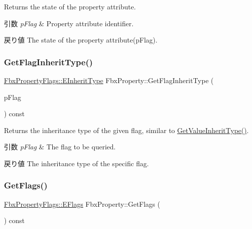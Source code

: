 Returns the state of the property attribute. 
\begin{DoxyParams}{引数}
{\em p\+Flag} & Property attribute identifier. \\
\hline
\end{DoxyParams}
\begin{DoxyReturn}{戻り値}
The state of the property attribute(p\+Flag). 
\end{DoxyReturn}
\mbox{\label{class_fbx_property_ad2c773361ba216ae0fdd3eb8d10cb4e2}} 
\subsubsection{\texorpdfstring{Get\+Flag\+Inherit\+Type()}{GetFlagInheritType()}}
{\footnotesize\ttfamily \hyperlink{class_fbx_property_flags_ae3b667a4fcac4b827fa186a698fec2f8}{Fbx\+Property\+Flags\+::\+E\+Inherit\+Type} Fbx\+Property\+::\+Get\+Flag\+Inherit\+Type (\begin{DoxyParamCaption}\item[{\hyperlink{class_fbx_property_flags_afabfa7e0949aac8a7dcdf8a141867e99}{Fbx\+Property\+Flags\+::\+E\+Flags}}]{p\+Flag }\end{DoxyParamCaption}) const}

Returns the inheritance type of the given flag, similar to \hyperlink{class_fbx_property_aee557d7603e73430d4034a03b631b75e}{Get\+Value\+Inherit\+Type()}. 
\begin{DoxyParams}{引数}
{\em p\+Flag} & The flag to be queried. \\
\hline
\end{DoxyParams}
\begin{DoxyReturn}{戻り値}
The inheritance type of the specific flag. 
\end{DoxyReturn}
\mbox{\label{class_fbx_property_a8a6c56ee1afdaac4fd6d750a6677f177}} 
\subsubsection{\texorpdfstring{Get\+Flags()}{GetFlags()}}
{\footnotesize\ttfamily \hyperlink{class_fbx_property_flags_afabfa7e0949aac8a7dcdf8a141867e99}{Fbx\+Property\+Flags\+::\+E\+Flags} Fbx\+Property\+::\+Get\+Flags (\begin{DoxyParamCaption}{ }\end{DoxyParamCaption}) const}

